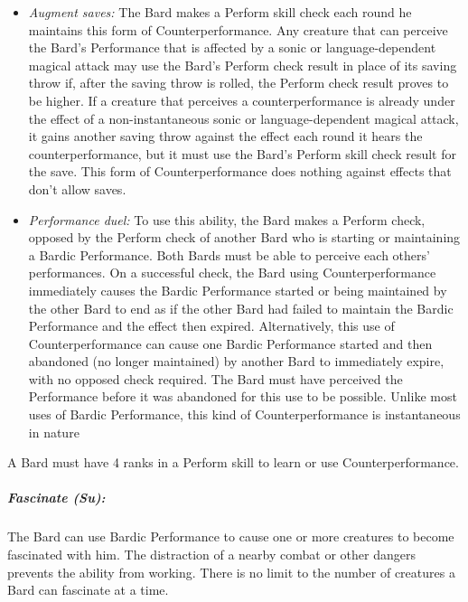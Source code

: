 \begin{itemize}
 \item \emph{Augment saves:} The Bard makes a Perform skill check each round he maintains this form of Counterperformance.
Any creature that can perceive the Bard's Performance that is affected by a sonic or language-dependent magical attack may use the Bard's Perform check result in place of its saving throw if, after the saving throw is rolled, the Perform check result proves to be higher. 
If a creature that perceives a counterperformance is already under the effect of a non-instantaneous sonic or language-dependent magical attack, it gains another saving throw against the effect each round it hears the counterperformance, but it must use the Bard's Perform skill check result for the save. 
This form of Counterperformance does nothing against effects that don't allow saves.
 \item \emph{Performance duel:} To use this ability, the Bard makes a Perform check, opposed by the Perform check of another Bard who is starting or maintaining a Bardic Performance. Both Bards must be able to perceive each others' performances. On a successful check, the Bard using Counterperformance immediately causes the Bardic Performance started or being maintained by the other Bard to end as if the other Bard had failed to maintain the Bardic Performance and the effect then expired.
 Alternatively, this use of Counterperformance can cause one Bardic Performance started and then abandoned (no longer maintained) by another Bard to immediately expire, with no opposed check required. The Bard must have perceived the Performance before it was abandoned for this use to be possible.
 Unlike most uses of Bardic Performance, this kind of Counterperformance is instantaneous in nature
\end{itemize}

A Bard must have 4 ranks in a Perform skill to learn or use Counterperformance.
\subparagraph{Fascinate (Su):}
The Bard can use Bardic Performance to cause one or more creatures to become fascinated with him. %
The distraction of a nearby combat or other dangers prevents the ability from working. There is no limit to the number of creatures a Bard can fascinate at a time.

